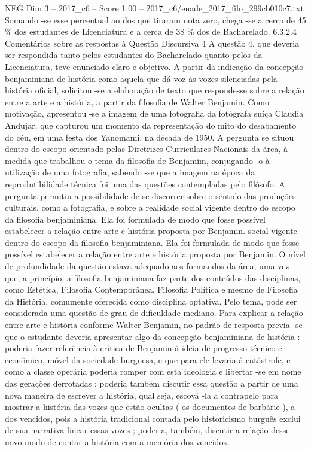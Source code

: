 \begin{textsample}{NEG Dim 3 – 2017\_c6 – Score 1.00 – 2017\_c6/enade\_2017\_filo\_299cb010c7.txt}
Somando -se esse percentual ao dos que tiraram nota zero, chega -se a cerca de 45 \% dos estudantes de Licenciatura e a cerca de 38 \% dos de Bacharelado. 6.3.2.4 Comentários sobre as respostas à Questão Discursiva 4 A questão 4, que deveria ser respondida tanto pelos estudantes do Bacharelado quanto pelos da Licenciatura, teve enunciado claro e objetivo.
A partir da indicação da concepção benjaminiana de história como aquela que dá voz às vozes silenciadas pela história oficial, solicitou -se a elaboração de texto que respondesse sobre a relação entre a arte e a história, a partir da filosofia de Walter Benjamin.
Como motivação, apresentou -se a imagem de uma fotografia da fotógrafa suíça Claudia Andujar, que capturou um momento da representação do mito do desabamento do céu, em uma festa dos Yanomami, na década de 1950.
A pergunta se situou dentro do escopo orientado pelas Diretrizes Curriculares Nacionais da área, à medida que trabalhou o tema da filosofia de Benjamim, conjugando -o à utilização de uma fotografia, sabendo -se que a imagem na época da reprodutibilidade técnica foi uma das questões contempladas pelo filósofo.
A pergunta permitiu a possibilidade de se discorrer sobre o sentido das produções culturais, como a fotografia, e sobre a realidade social vigente dentro do escopo da filosofia benjaminiana.
Ela foi formulada de modo que fosse possível estabelecer a relação entre arte e história proposta por Benjamin. social vigente dentro do escopo da filosofia benjaminiana.
Ela foi formulada de modo que fosse possível estabelecer a relação entre arte e história proposta por Benjamin.
O nível de profundidade da questão estava adequado aos formandos da área, uma vez que, a princípio, a filosofia benjaminiana faz parte dos conteúdos das disciplinas, como Estética, Filosofia Contemporânea, Filosofia Política e mesmo de Filosofia da História, comumente oferecida como disciplina optativa.
Pelo tema, pode ser considerada uma questão de grau de dificuldade mediano.
Para explicar a relação entre arte e história conforme Walter Benjamin, no padrão de resposta previa -se que o estudante deveria apresentar algo da concepção benjaminiana de história : poderia fazer referência à crítica de Benjamin à ideia de progresso técnico e econômico, móvel da sociedade burguesa, e que para ele levaria à catástrofe, e como a classe operária poderia romper com esta ideologia e libertar -se em nome das gerações derrotadas ; poderia também discutir essa questão a partir de uma nova maneira de escrever a história, qual seja, escová -la a contrapelo para mostrar a história das vozes que estão ocultas ( os documentos de barbárie ), a dos vencidos, pois a história tradicional contada pelo historicismo burguês exclui de sua narrativa linear essas vozes ; poderia, também, discutir a relação desse novo modo de contar a história com a memória dos vencidos.

\end{textsample}
